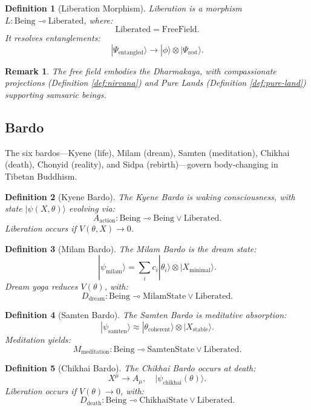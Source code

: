 \documentclass{article}
\newtheorem{definition}{Definition}
\newtheorem{remark}{Remark}
\begin{document}
\begin{definition}[Liberation Morphism]
\label{def:liberation-morphism}
Liberation is a morphism \( L: \text{Being} \multimap \text{Liberated} \), where:
\[
\text{Liberated} = \text{FreeField}.
\]
It resolves entanglements:
\[
|\Psi_{\text{entangled}}\rangle \to |\phi\rangle \otimes |\Psi_{\text{rest}}\rangle.
\]
\end{definition}

\begin{remark}
The free field embodies the Dharmakaya, with compassionate projections (Definition \ref{def:nirvana}) and Pure Lands (Definition \ref{def:pure-land}) supporting samsaric beings.
\end{remark}

\subsection{Bardo}
\label{sec:bardo}
The six bardos—Kyene (life), Milam (dream), Samten (meditation), Chikhai (death), Chonyid (reality), and Sidpa (rebirth)—govern body-changing in Tibetan Buddhism.

\begin{definition}[Kyene Bardo]
\label{def:kyene-bardo}
The Kyene Bardo is waking consciousness, with state \( |\psi(X, \theta)\rangle \) evolving via:
\[
A_{\text{action}} : \text{Being} \multimap \text{Being} \lor \text{Liberated}.
\]
Liberation occurs if \( V(\theta, X) \to 0 \).
\end{definition}

\begin{definition}[Milam Bardo]
\label{def:milam-bardo}
The Milam Bardo is the dream state:
\[
|\psi_{\text{milam}}\rangle = \sum_i c_i |\theta_i\rangle \otimes |X_{\text{minimal}}\rangle.
\]
Dream yoga reduces \( V(\theta) \), with:
\[
D_{\text{dream}} : \text{Being} \multimap \text{MilamState} \lor \text{Liberated}.
\]
\end{definition}

\begin{definition}[Samten Bardo]
\label{def:samten-bardo}
The Samten Bardo is meditative absorption:
\[
|\psi_{\text{samten}}\rangle \approx |\theta_{\text{coherent}}\rangle \otimes |X_{\text{stable}}\rangle.
\]
Meditation yields:
\[
M_{\text{meditation}} : \text{Being} \multimap \text{SamtenState} \lor \text{Liberated}.
\]
\end{definition}

\begin{definition}[Chikhai Bardo]
\label{def:chikhai-bardo}
The Chikhai Bardo occurs at death:
\[
X^\mu \to A_\mu, \quad |\psi_{\text{chikhai}}(\theta)\rangle.
\]
Liberation occurs if \( V(\theta) \to 0 \), with:
\[
D_{\text{death}} : \text{Being} \multimap \text{ChikhaiState} \lor \text{Liberated}.
\]
\end{definition}
\end{document}
